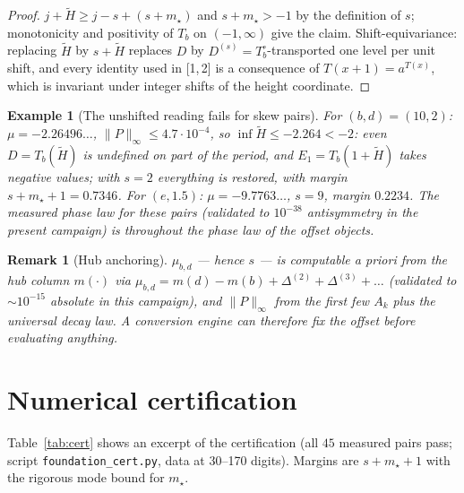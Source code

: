 \documentclass[11pt]{article}
\newtheorem{remark}[theorem]{Remark}
\newtheorem{example}[theorem]{Example}
\begin{document}
\begin{proof}
$j+\widetilde H\ge j-s+(s+m_\star)$ and $s+m_\star>-1$ by the definition of
$s$; monotonicity and positivity of $T_b$ on $(-1,\infty)$ give the claim.
Shift-equivariance: replacing $\widetilde H$ by $s+\widetilde H$ replaces
$D$ by $D^{(s)}=T_b^{\circ}\!$-transported one level per unit shift, and every
identity used in {\rm[1,\,2]} is a consequence of $T(x+1)=a^{T(x)}$, which is
invariant under integer shifts of the height coordinate.
\end{proof}

\begin{example}[The unshifted reading fails for skew pairs]\label{ex:fail}
For $(b,d)=(10,2)$: $\mu=-2.26496\ldots$, $\|P\|_\infty\le4.7\cdot10^{-4}$,
so $\inf\widetilde H\le-2.264<-2$: even $D=T_b(\widetilde H)$ is undefined on
part of the period, and $E_1=T_b(1+\widetilde H)$ takes negative values; with
$s=2$ everything is restored, with margin $s+m_\star+1=0.7346$.
For $(e,1.5)$: $\mu=-9.7763\ldots$, $s=9$, margin $0.2234$.
The measured phase law for these pairs (validated to
$10^{-38}$ antisymmetry in the present campaign) is throughout the phase law
\emph{of the offset objects}.
\end{example}

\begin{remark}[Hub anchoring]
$\mu_{b,d}$ --- hence $s$ --- is computable a priori from the hub column
$m(\cdot)$ via $\mu_{b,d}=m(d)-m(b)+\Delta^{(2)}+\Delta^{(3)}+\dots$
(validated to $\sim10^{-15}$ absolute in this campaign), and
$\|P\|_\infty$ from the first few $A_k$ plus the universal decay law.  A
conversion engine can therefore fix the offset \emph{before} evaluating
anything.
\end{remark}

\section{Numerical certification}\label{sec:cert}

Table~\ref{tab:cert} shows an excerpt of the certification (all $45$ measured
pairs pass; script \texttt{foundation\_cert.py}, data at 30--170 digits).
Margins are $s+m_\star+1$ with the rigorous mode bound for $m_\star$.
\end{document}
